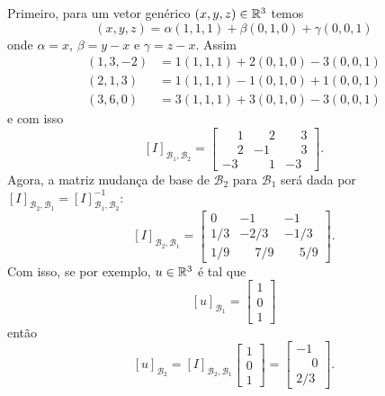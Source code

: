 \begin{exemplos}
\begin{enumerate}[label={\arabic*})]
\begin{solucao}
            Primeiro, para um vetor genérico $(x, y, z) \in \mathbb{R}^3$ temos
            \[
                (x, y, z) = \alpha(1, 1, 1) + \beta(0, 1, 0) + \gamma(0, 0, 1)
            \]
            onde $\alpha = x$, $\beta = y - x$ e $\gamma = z - x$. Assim
            \begin{align*}
                (1, 3, -2) &= 1(1, 1, 1) + 2(0, 1, 0) - 3(0, 0, 1)\\
                (2, 1, 3) &= 1(1, 1, 1) - 1(0, 1, 0) + 1(0, 0, 1)\\
                (3, 6, 0) &= 3(1, 1, 1) + 3(0, 1, 0) - 3(0, 0, 1)
            \end{align*}
            e com isso
            \[
                [I]_{\mathcal{B}_1, \mathcal{B}_2} = \begin{bmatrix}\phantom{-}1 & \phantom{-}2 & \phantom{-}3\\\phantom{-}2 & -1 & \phantom{-}3\\-3 & \phantom{-}1 & -3\end{bmatrix}.
            \]
            Agora, a matriz mudança de base de $\mathcal{B}_2$ para $\mathcal{B}_1$ será dada por $[I]_{\mathcal{B}_2, \mathcal{B}_1} = [I]_{\mathcal{B}_1, \mathcal{B}_2}^{-1}$:
            \[
                [I]_{\mathcal{B}_2, \mathcal{B}_1} = \begin{bmatrix}0 & -1 & -1\\1/3 & -2/3 & -1/3\\1/9 & \phantom{-}7/9 & \phantom{-}5/9\end{bmatrix}.
            \]
            Com isso, se por exemplo, $u \in \mathbb{R}^3$ é tal que
            \[
                [u]_{\mathcal{B}_1} = \begin{bmatrix}1\\0\\1\end{bmatrix}
            \]
            então
            \[
                [u]_{\mathcal{B}_2} = [I]_{\mathcal{B}_2, \mathcal{B}_1}\begin{bmatrix}1\\0\\1\end{bmatrix} = \begin{bmatrix}-1\\\phantom{-}0\\2/3\end{bmatrix}.
            \]
        \end{solucao}


\end{enumerate}
\end{exemplos}
